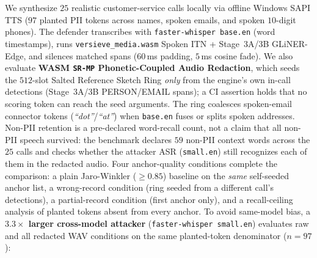 \documentclass{article}
\begin{document}
We synthesize $25$ realistic customer-service calls locally via offline Windows SAPI TTS ($97$ planted PII tokens across names, spoken emails, and spoken $10$-digit phones). The defender transcribes with \texttt{faster-whisper base.en} \citep{radford2023whisper} (word timestamps), runs \texttt{versieve\_media.wasm} Spoken ITN + Stage~3A/3B GLiNER-Edge, and silences matched spans ($60$\,ms padding, $5$\,ms cosine fade). We also evaluate \textbf{WASM \texttt{SR-MP} Phonetic-Coupled Audio Redaction}, which seeds the $512$-slot Salted Reference Sketch Ring \emph{only} from the engine's own in-call detections (Stage~3A/3B PERSON/EMAIL spans); a CI assertion holds that no scoring token can reach the seed arguments. The ring coalesces spoken-email connector tokens (\emph{``dot''}/\emph{``at''}) when \texttt{base.en} fuses or splits spoken addresses. Non-PII retention is a pre-declared word-recall count, not a claim that all non-PII speech survived: the benchmark declares $59$ non-PII context words across the $25$ calls and checks whether the attacker ASR (\texttt{small.en}) still recognizes each of them in the redacted audio. Four anchor-quality conditions complete the comparison: a plain Jaro-Winkler ($\ge 0.85$) baseline on the \emph{same} self-seeded anchor list, a wrong-record condition (ring seeded from a different call's detections), a partial-record condition (first anchor only), and a recall-ceiling analysis of planted tokens absent from every anchor. To avoid same-model bias, a \textbf{$3.3\times$ larger cross-model attacker} (\texttt{faster-whisper small.en}) evaluates raw and all redacted WAV conditions on the same planted-token denominator ($n{=}97$):
\end{document}
